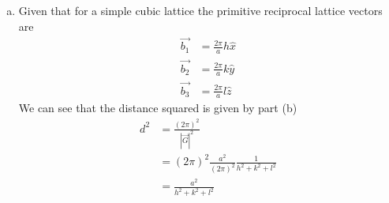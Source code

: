 \documentclass[11pt]{article}
\numberwithin{equation}{section}
\begin{document}
\begin{enumerate}[(a)]
\item
Given that for a simple cubic lattice the primitive reciprocal lattice vectors are
\begin{align*}
\vec{b_1} &= \frac{2\pi}{a}h\hat{x}\\
\vec{b_2} &= \frac{2\pi}{a}k\hat{y}\\
\vec{b_3} &= \frac{2\pi}{a}l\hat{z}
\end{align*}
We can see that the distance squared is given by part (b)
\begin{align*}
d^2 &= \frac{(2\pi)^2}{|\vec{G}|^2}\\
&= (2\pi)^2\frac{a^2}{(2\pi)^2}\frac{1}{h^2+k^2+l^2}\\
&= \frac{a^2}{h^2+k^2+l^2}
\end{align*}
\end{enumerate}
\end{document}
